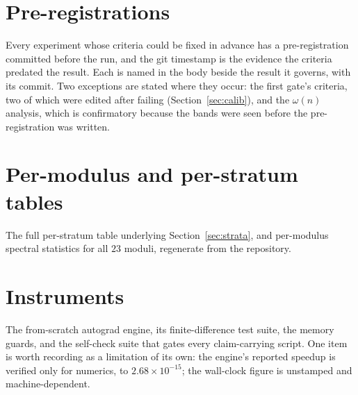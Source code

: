 \section{Pre-registrations}
\label{app:prereg}

Every experiment whose criteria could be fixed in advance has a pre-registration committed
before the run, and the git timestamp is the evidence the criteria predated the result. Each is
named in the body beside the result it governs, with its commit. Two exceptions are stated
where they occur: the first gate's criteria, two of which were edited after failing
(Section~\ref{sec:calib}), and the $\omega(n)$ analysis, which is confirmatory because the
bands were seen before the pre-registration was written.

\section{Per-modulus and per-stratum tables}
\label{app:tables}

The full per-stratum table underlying Section~\ref{sec:strata}, and per-modulus spectral
statistics for all $23$ moduli, regenerate from the repository.

\section{Instruments}
\label{app:instruments}

The from-scratch autograd engine, its finite-difference test suite, the memory guards, and the
self-check suite that gates every claim-carrying script. One item is worth recording as a
limitation of its own: the engine's reported speedup is verified only for numerics, to
$2.68 \times 10^{-15}$; the wall-clock figure is unstamped and machine-dependent.
